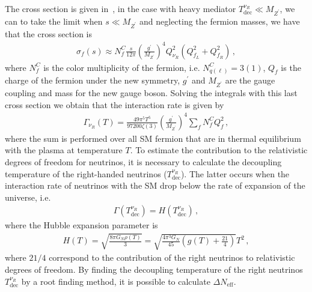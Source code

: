 \documentclass[12pt]{article}
\begin{document}
The cross section is given in~\cite{Barger:2003zh}, in the case with heavy mediator $T^{\nu_R}_{\text{dec}} \ll M_{Z^{\prime}}$, we can to take the limit when $s \ll M_{Z^{\prime}}$ and neglecting the fermion masses, we have that the cross section is
%
\begin{align*}
    \sigma_{f}(s) \approx N^{C}_{f} \frac{s}{12 \pi} \left( \frac{g^{\prime}}{M_{Z^{\prime}}} \right)^{4} Q^{2}_{\nu_R} (Q^{2}_{f_L} + Q^{2}_{f_R})\,,
\end{align*}
%
where $N^{C}_{f}$ is the color multiplicity of the fermion, i.e. $N^{C}_{q(\ell)} = 3(1)$, $Q_{f}$ is the charge of the fermion under the new symmetry, $g^{\prime}$ and $M_{Z^{\prime}}$ are the gauge coupling and mass for the new gauge boson. Solving the integrals with this last cross section we obtain that the interaction rate is given by
%
\begin{align*}
    \Gamma_{\nu_{R}}(T) = \frac{49 \pi^{5} T^{5}}{97200 \zeta(3)} \left( \frac{g^{\prime}}{M_{Z^{\prime}}} \right)^{4} \sum_{f} N^{C}_{f} Q^{2}_{f}\,,
\end{align*}
%
where the sum is performed over all SM fermion that are in thermal equilibrium with the plasma at temperature $T$. To estimate the contribution to the relativistic degrees of freedom for neutrinos, it is necessary to calculate the decoupling temperature of the right-handed neutrinos ($T^{\nu_R}_{\text{dec}}$). The latter occurs when the interaction rate of neutrinos with the SM drop below the rate of expansion of the universe, i.e.
%
\begin{align*}
\Gamma(T^{\nu_R}_{\text{dec}}) = H(T^{\nu_R}_{\text{dec}})\,, 
\end{align*}
%
where the Hubble expansion parameter is
%
\begin{align*}
    H(T) = \sqrt{\frac{8 \pi G_{N} \rho(T)}{3}} = \sqrt{\frac{4 \pi^{3} G_{N}}{45} \left( g(T) + \frac{21}{4} \right)} T^{2}\,,
\end{align*}
%
where $21/4$ correspond to the contribution of the right neutrinos to relativistic degrees of freedom. By finding the decoupling temperature of the right neutrinos $T^{\nu_R}_{\text{dec}} $ by a root finding method, it is possible to calculate $\Delta N_{\text{eff}}$.
\end{document}
